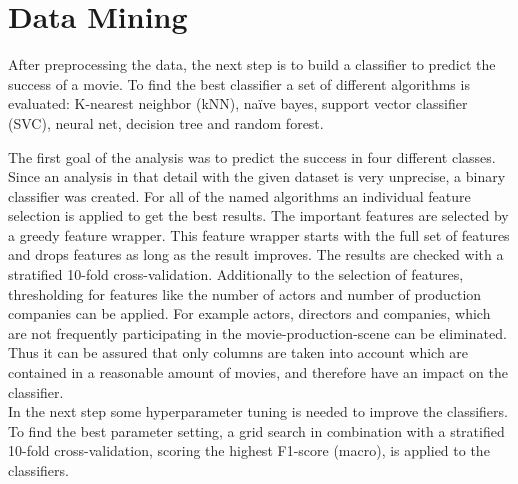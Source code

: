 \begingroup
\renewcommand{\clearpage}{}
\chapter{Data Mining}\label{cha:data_mining}
\endgroup




After preprocessing the data, the next step is to build a classifier to predict the success of a movie. To find the best classifier a set of different algorithms is evaluated:
K-nearest neighbor (kNN), 
na\"{i}ve bayes, 
support vector classifier (SVC), 
neural net, 
decision tree and 
random forest.

The first goal of the analysis was to predict the success in four different classes. Since an analysis in that detail with the given dataset is very unprecise, a binary classifier was created.
For all of the named algorithms an individual feature selection is applied to get the best results. The important features are selected by a greedy feature wrapper. This feature wrapper starts with the full set of features and drops features as long as the result improves. The results are checked with a stratified 10-fold cross-validation. Additionally to the selection of features, thresholding for features like the number of actors and number of production companies can be applied. For example actors, directors and companies, which are not frequently participating in the movie-production-scene can be eliminated. Thus it can be assured that only columns are taken into account which are contained in a reasonable amount of movies, and therefore have an impact on the classifier. \\
In the next step some hyperparameter tuning is needed to improve the classifiers. To find the best parameter setting, a grid search in combination with a stratified 10-fold cross-validation, scoring the highest F1-score (macro), is applied to the classifiers.


